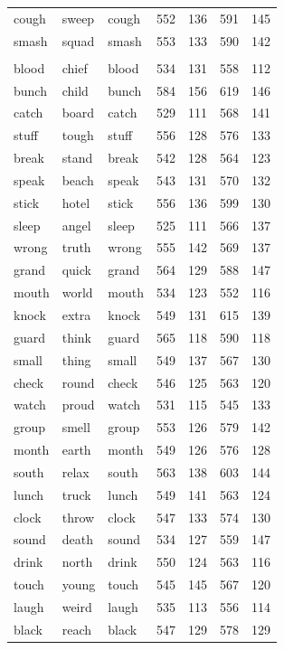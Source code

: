 \documentclass[
]{interact}
\begin{document}
\begin{longtable*}{lllrrrr}
cough & sweep & cough & 552 & 136 & 591 & 145 \\ 
smash & squad & smash & 553 & 133 & 590 & 142 \\ 
\midrule\addlinespace[2.5pt]
 \\ 
\midrule\addlinespace[2.5pt]
blood & chief & blood & 534 & 131 & 558 & 112 \\ 
bunch & child & bunch & 584 & 156 & 619 & 146 \\ 
catch & board & catch & 529 & 111 & 568 & 141 \\ 
stuff & tough & stuff & 556 & 128 & 576 & 133 \\ 
break & stand & break & 542 & 128 & 564 & 123 \\ 
speak & beach & speak & 543 & 131 & 570 & 132 \\ 
stick & hotel & stick & 556 & 136 & 599 & 130 \\ 
sleep & angel & sleep & 525 & 111 & 566 & 137 \\ 
wrong & truth & wrong & 555 & 142 & 569 & 137 \\ 
grand & quick & grand & 564 & 129 & 588 & 147 \\ 
mouth & world & mouth & 534 & 123 & 552 & 116 \\ 
knock & extra & knock & 549 & 131 & 615 & 139 \\ 
guard & think & guard & 565 & 118 & 590 & 118 \\ 
small & thing & small & 549 & 137 & 567 & 130 \\ 
check & round & check & 546 & 125 & 563 & 120 \\ 
watch & proud & watch & 531 & 115 & 545 & 133 \\ 
group & smell & group & 553 & 126 & 579 & 142 \\ 
month & earth & month & 549 & 126 & 576 & 128 \\ 
south & relax & south & 563 & 138 & 603 & 144 \\ 
lunch & truck & lunch & 549 & 141 & 563 & 124 \\ 
clock & throw & clock & 547 & 133 & 574 & 130 \\ 
sound & death & sound & 534 & 127 & 559 & 147 \\ 
drink & north & drink & 550 & 124 & 563 & 116 \\ 
touch & young & touch & 545 & 145 & 567 & 120 \\ 
laugh & weird & laugh & 535 & 113 & 556 & 114 \\ 
black & reach & black & 547 & 129 & 578 & 129 \\ 

\end{longtable*}
\end{document}
